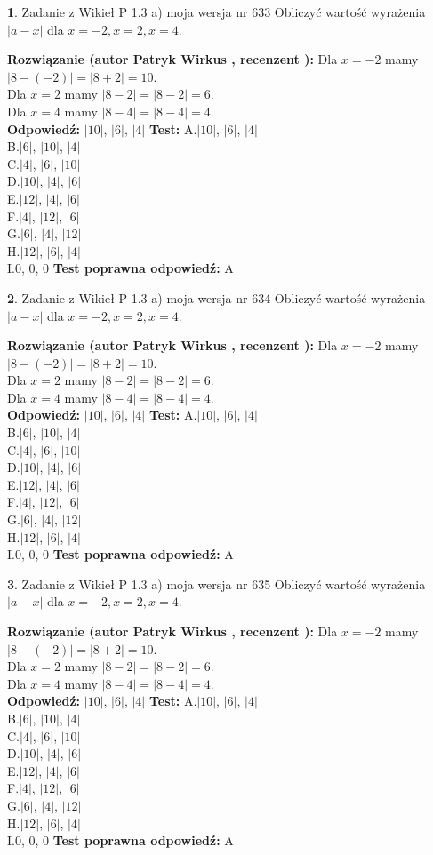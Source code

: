 \documentclass[12pt, a4paper]{article}
\theoremstyle{definition} %
\newtheorem{zad}{}
\newcommand{\zadStart}[1]{\begin{zad}#1\newline}
\newcommand{\zadStop}{\end{zad}}
\newcommand{\rozwStart}[2]{\noindent \textbf{Rozwiązanie (autor #1 , recenzent #2): }\newline}
\newcommand{\rozwStop}{\newline}
\newcommand{\odpStart}{\noindent \textbf{Odpowiedź:}\newline}
\newcommand{\odpStop}{\newline}
\newcommand{\testStart}{\noindent \textbf{Test:}\newline}
\newcommand{\testStop}{\newline}
\newcommand{\kluczStart}{\noindent \textbf{Test poprawna odpowiedź:}\newline}
\newcommand{\kluczStop}{\newline}
\begin{document}
\zadStart{Zadanie z Wikieł P 1.3 a) moja wersja nr 633}
Obliczyć wartość wyrażenia $|a - x|$ dla $x=-2,x=2,x=4$.
\zadStop
\rozwStart{Patryk Wirkus}{}
Dla $x = -2$ mamy $|8 - (-2)| = |8 + 2| = 10$.\\
Dla $x = 2$ mamy $|8 - 2| = |8 - 2| = 6$.\\
Dla $x = 4$ mamy $|8 - 4| = |8 - 4| = 4$.\\
\rozwStop
\odpStart
$|10|$, $|6|$, $|4|$
\odpStop
\testStart
A.$|10|$, $|6|$, $|4|$\\
B.$|6|$, $|10|$, $|4|$\\
C.$|4|$, $|6|$, $|10|$\\
D.$|10|$, $|4|$, $|6|$\\
E.$|12|$, $|4|$, $|6|$\\
F.$|4|$, $|12|$, $|6|$\\
G.$|6|$, $|4|$, $|12|$\\
H.$|12|$, $|6|$, $|4|$\\
I.$0$, $0$, $0$
\testStop
\kluczStart
A
\kluczStop



\zadStart{Zadanie z Wikieł P 1.3 a) moja wersja nr 634}
Obliczyć wartość wyrażenia $|a - x|$ dla $x=-2,x=2,x=4$.
\zadStop
\rozwStart{Patryk Wirkus}{}
Dla $x = -2$ mamy $|8 - (-2)| = |8 + 2| = 10$.\\
Dla $x = 2$ mamy $|8 - 2| = |8 - 2| = 6$.\\
Dla $x = 4$ mamy $|8 - 4| = |8 - 4| = 4$.\\
\rozwStop
\odpStart
$|10|$, $|6|$, $|4|$
\odpStop
\testStart
A.$|10|$, $|6|$, $|4|$\\
B.$|6|$, $|10|$, $|4|$\\
C.$|4|$, $|6|$, $|10|$\\
D.$|10|$, $|4|$, $|6|$\\
E.$|12|$, $|4|$, $|6|$\\
F.$|4|$, $|12|$, $|6|$\\
G.$|6|$, $|4|$, $|12|$\\
H.$|12|$, $|6|$, $|4|$\\
I.$0$, $0$, $0$
\testStop
\kluczStart
A
\kluczStop



\zadStart{Zadanie z Wikieł P 1.3 a) moja wersja nr 635}
Obliczyć wartość wyrażenia $|a - x|$ dla $x=-2,x=2,x=4$.
\zadStop
\rozwStart{Patryk Wirkus}{}
Dla $x = -2$ mamy $|8 - (-2)| = |8 + 2| = 10$.\\
Dla $x = 2$ mamy $|8 - 2| = |8 - 2| = 6$.\\
Dla $x = 4$ mamy $|8 - 4| = |8 - 4| = 4$.\\
\rozwStop
\odpStart
$|10|$, $|6|$, $|4|$
\odpStop
\testStart
A.$|10|$, $|6|$, $|4|$\\
B.$|6|$, $|10|$, $|4|$\\
C.$|4|$, $|6|$, $|10|$\\
D.$|10|$, $|4|$, $|6|$\\
E.$|12|$, $|4|$, $|6|$\\
F.$|4|$, $|12|$, $|6|$\\
G.$|6|$, $|4|$, $|12|$\\
H.$|12|$, $|6|$, $|4|$\\
I.$0$, $0$, $0$
\testStop
\kluczStart
A
\kluczStop
\end{document}

